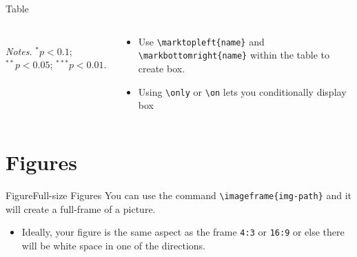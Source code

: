 \documentclass[aspectratio=169]{beamer}
\begin{document}
\begin{frame}{Table}
\begin{columns}[T]
\begin{column}{.6\textwidth}
\begin{table}[!htbp]
\begin{adjustbox}{max width = \textwidth, width = 0.8 \textwidth, center}
\begin{threeparttable}
\begin{tabular}{@{} l *{2}{r} @{}}
              \end{tabular} 
              \begin{tablenotes}
                  \item \textit{Notes.} $^{*} p<0.1$; $^{**} p<0.05$; $^{***} p<0.01$.
              \end{tablenotes}
          \end{threeparttable}
      \end{adjustbox}
    \end{table}

      \vspace*{50mm} %
  \end{column}
  \hfill
  \begin{column}{.4\textwidth}
      \begin{itemize}
          \item Use \texttt{\textbackslash marktopleft\{name\}} and \texttt{\textbackslash markbottomright\{name\}} within the table to create box.
          \item Using \texttt{\textbackslash only} or \texttt{\textbackslash on} lets you conditionally display box
      \end{itemize}
  \end{column}
\end{columns}

\end{frame}

\section{Figures}



\begin{frame}{Figure}{Full-size Figures}
  You can use the command \texttt{\textbackslash imageframe\{img-path\}} and it will create a full-frame of a picture. 
  
  \begin{itemize}
    \item Ideally, your figure is the same aspect as the frame \texttt{4:3} or \texttt{16:9} or else there will be white space in one of the directions.
  \end{itemize}
\end{frame}
\end{document}
